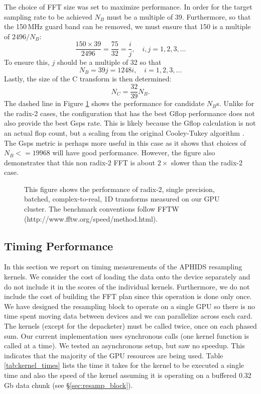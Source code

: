 The choice of FFT size was set to maximize performance.  In order for the target sampling rate to be achieved
$N_B$ must be a multiple of 39.  Furthermore, so that the 150\,MHz guard band can be removed, we must ensure that 
150 is a multiple of $2496/N_B$:
\begin{equation}
\frac{150\times39}{2496} = \frac{75}{32} = \frac{i}{j}, \quad i,j = 1, 2,3, \ldots
\end{equation}
To ensure this, $j$ should be a multiple of 32 so that 
\begin{equation}
N_B = 39j = 1248i, \quad i=1,2,3,\ldots
\end{equation}
Lastly, the size of the C transform is then determined:
\begin{equation}
N_C = \frac{32}{39} N_B.
\end{equation}
The dashed line in Figure \ref{fig:C2R_performance} shows the performance for candidate $N_B$s.  Unlike for 
the radix-2 cases, the configuration that has the best Gflop performance does not also provide the best Gsps
rate.  This is likely because the Gflop calculation is not an actual flop count, but a scaling from the 
original Cooley-Tukey algorithm \citep{cooley65}.  The Gsps metric is perhaps more useful in this case as it
shows that choices of $N_B <= 19968$ will have good performance.  However, the figure also demonstrates
that this non radix-2 FFT is about $2\times$ slower than the radix-2 case.

\begin{figure}[t!]
\caption{This figure shows the performance of radix-2, single precision, batched, complex-to-real, 1D transforms 
measured on our GPU cluster. The benchmark conventions follow FFTW  (http://www.fftw.org/speed/method.html).}
\label{fig:C2R_performance}
\end{figure}

\subsection{Timing Performance}

In this section we report on timing measurements of the APHIDS resampling kernels.  We consider the cost of 
loading the data onto the device separately and do not include it in the scores of the individual kernels.  
Furthermore, we do not include the cost of building the FFT plan since this operation is done only once.
We have designed the resampling block to operate on a single GPU so there is no time spent moving data 
between devices and we can parallelize across each card.  The
kernels (except for the depacketer) must be called
twice, once on each phased sum.  Our current implementation uses synchronous calls (one kernel function is 
called at a time).  We tested an asynchronous setup, but saw no speedup.  This indicates that the majority of 
the GPU resources are being used.  Table \ref{tab:kernel_times} lists the time it takes for the kernel to be 
executed a single time and also the speed of the kernel assuming it is operating on a buffered 0.32\,Gb data 
chunk (see \S\ref{sec:resamp_block}).

